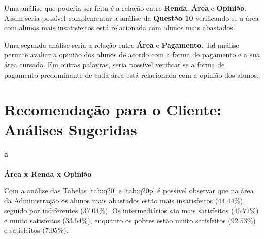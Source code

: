 \documentclass[10pt,a4paper,oneside]{article}
\newcommand{\adm}{Administração\xspace}
\begin{document}
Uma análise que poderia ser feita é a relação entre \textbf{Renda}, \textbf{Área} e \textbf{Opinião}. Assim seria possível complementar a análise da \textbf{Questão 10} verificando se a área com alunos mais 
insatisfeitos está relacionada com alunos mais abastados.

Uma segunda análise seria a relação entre \textbf{Área} e \textbf{Pagamento}. Tal análise permite avaliar a opinião dos alunos de acordo com a forma de pagamento e a sua área cursada. Em outras palavras, seria 
possível verificar se a forma de pagamento predominante de cada área está relacionada com a opinião dos alunos.

\FloatBarrier
\section{Recomendação para o Cliente: Análises Sugeridas}
\label{section:analises}

\paragraph{a}{\textbf{Área x Renda x Opinião}}

Com a análise das Tabelas \ref{tab:q20} e \ref{tab:q20p} é possível observar que na área da \adm os alunos mais abastados estão mais insatisfeitos ($44.44\%$), seguido por 
indiferentes (37.04\%). Os intermediários são mais satisfeitos ($46.71\%$) e muito satisfeitos ($33.54\%$), enquanto os pobres estão muito satisfeitos ($92.53\%$) e satisfeitos ($7.05\%$).



\end{document}
